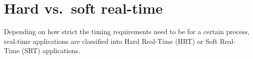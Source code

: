 \section{Hard vs.\ soft real-time} \label{sec:hard_vs_soft_rt}

Depending on how strict the timing requirements need to be for a certain process, real-time applications are classified into Hard Real-Time (HRT) or Soft Real-Time (SRT) applications.


